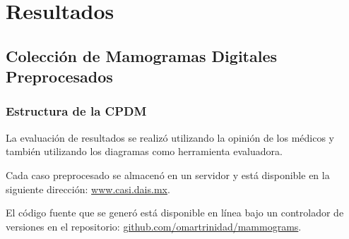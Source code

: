 \chapter{Resultados}
\label{resultados}


\section{Colección de Mamogramas Digitales Preprocesados}

\subsection{Estructura de la CPDM}

\shorthandoff{>} %
    
\shorthandon{>} 

La evaluación de resultados se realizó utilizando la opinión de los médicos y 
también utilizando los diagramas como herramienta evaluadora.

Cada caso preprocesado se almacenó en un servidor y está disponible en la siguiente
dirección: \url{www.casi.dais.mx}.

El código fuente que se generó está disponible en línea bajo un controlador de
versiones en el repositorio: \url{github.com/omartrinidad/mammograms}.



